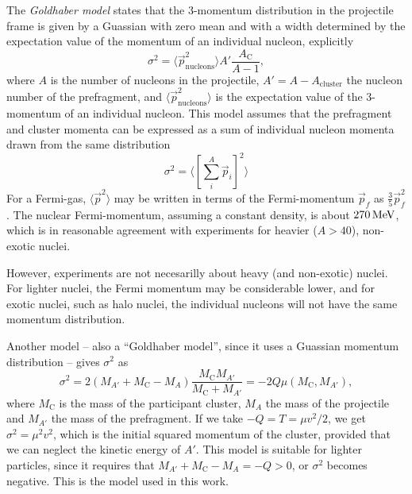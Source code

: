 The \emph{Goldhaber model} states that the 3-momentum distribution in the projectile frame is given by a Guassian with zero mean and with a width determined by the expectation value of the momentum of an individual nucleon, explicitly
\begin{equation}
\sigma^2 = \langle \vec{p}_\text{nucleons}^2 \rangle A'\frac{A_\text{C}}{A-1},
\end{equation}
where $A$ is the number of nucleons in the projectile, $A' = A-A_\text{cluster}$ the nucleon number of the prefragment, and $\langle \vec{p}_\text{nucleons}^2 \rangle$ is the expectation value of the 3-momentum of an individual nucleon. This model assumes that the prefragment and cluster momenta can be expressed as a sum of individual nucleon momenta drawn from the same distribution
\begin{equation}
\sigma^2 = \langle \left[\sum_i^A \vec{p}_i\right]^2 \rangle
\end{equation}
For a Fermi-gas, $\langle \vec{p}^2 \rangle$ may be written in terms of the Fermi-momentum $\vec{p}_f$ as $\tfrac{3}{5} \vec{p}_f^2$\cite{goldhaber:1974:art}.
The nuclear Fermi-momentum, assuming a constant density, is about $\unit[270]{MeV}$, which is in reasonable agreement with experiments for heavier ($A>40$), non-exotic nuclei\cite{moniz:1971}. 

However, \rtb{} experiments are not necesarilly about heavy (and non-exotic) nuclei. For lighter nuclei, the Fermi momentum may be considerable lower\cite{bartke2009introduction}, and for exotic nuclei, such as halo nuclei, the individual nucleons will not have the same momentum distribution.

Another model -- also a ``Goldhaber model'', since it uses a Guassian momentum distribution -- gives $\sigma^2$ as
\begin{equation}
\sigma^2 = 2 (M_{A'} + M_\text{C} -M_A) \frac{M_\text{C}M_{A'}}{M_\text{C}+M_{A'}} = -2 Q \mu(M_\text{C},M_{A'}),
\end{equation}
where $M_\text{C}$ is the mass of the participant cluster, $M_A$ the mass of the projectile and $M_{A'}$ the mass of the prefragment. If we take $-Q=T = \mu v^2/2$, we get $\sigma^2 = \mu^2 v^2$, which is the initial squared momentum of the cluster, provided that we can neglect the kinetic energy of $A'$. This model is suitable for lighter particles, since it requires that $M_{A'} + M_\text{C} -M_A = -Q >0$, or $\sigma^2$ becomes negative. This is the model used in this work.

